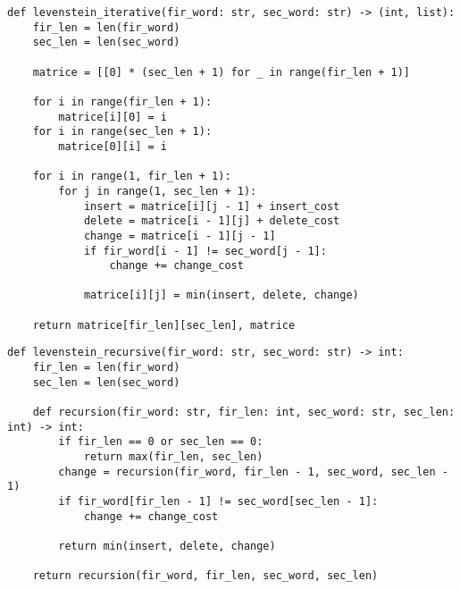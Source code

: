 \documentclass[a4paper,14pt, unknownkeysallowed]{extreport}
\begin{document}
\begin{center}
\captionsetup{justification=raggedright,singlelinecheck=off}
\begin{lstlisting}[label=lst:lev_iterative,caption=Реализация итерационного нахождения расстояния Левенштейна]
def levenstein_iterative(fir_word: str, sec_word: str) -> (int, list):
    fir_len = len(fir_word)
    sec_len = len(sec_word)

    matrice = [[0] * (sec_len + 1) for _ in range(fir_len + 1)]

    for i in range(fir_len + 1):
        matrice[i][0] = i
    for i in range(sec_len + 1):
        matrice[0][i] = i

    for i in range(1, fir_len + 1):
        for j in range(1, sec_len + 1):
            insert = matrice[i][j - 1] + insert_cost
            delete = matrice[i - 1][j] + delete_cost
            change = matrice[i - 1][j - 1]
            if fir_word[i - 1] != sec_word[j - 1]:
                change += change_cost

            matrice[i][j] = min(insert, delete, change)

    return matrice[fir_len][sec_len], matrice
\end{lstlisting}
\end{center}

\clearpage

\begin{center}
\captionsetup{justification=raggedright,singlelinecheck=off}
\begin{lstlisting}[label=lst:lev_recursive,caption=Реализация нахождения расстояния Левенштейна рекурсивно]
def levenstein_recursive(fir_word: str, sec_word: str) -> int:
    fir_len = len(fir_word)
    sec_len = len(sec_word)

    def recursion(fir_word: str, fir_len: int, sec_word: str, sec_len: int) -> int:
        if fir_len == 0 or sec_len == 0:
            return max(fir_len, sec_len)
        change = recursion(fir_word, fir_len - 1, sec_word, sec_len - 1)
        if fir_word[fir_len - 1] != sec_word[sec_len - 1]:
            change += change_cost

        return min(insert, delete, change)

    return recursion(fir_word, fir_len, sec_word, sec_len)
\end{lstlisting}
\end{center}

\clearpage
\end{document}

